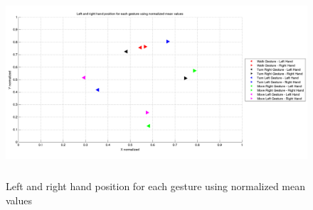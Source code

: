 \begin{figure}
	[h]
	\includegraphics[height=70mm]{figures/result/train-all-ges-mean.png} \caption{Left and right hand position for each gesture using normalized mean values} \label{fg:ev:mean} 
\end{figure}
